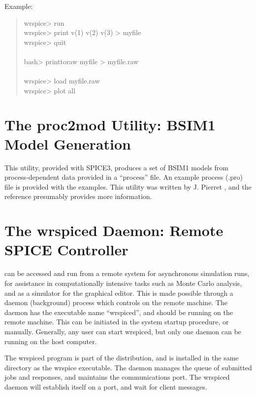 {Example:
\begin{quote}
{\vt wrspice> run}\\
{\vt wrspice> print v(1) v(2) v(3) > myfile}\\
{\vt wrspice> quit}\\
\\
{\vt bash> printtoraw myfile > myfile.raw}\\
\\
{\vt wrspice> load myfile.raw}\\
{\vt wrspice> plot all}
\end{quote}


\section{The {\vt proc2mod} Utility: BSIM1 Model Generation}


This utility, provided with SPICE3, produces a set of BSIM1 models
from process-dependent data provided in a ``process'' file.  An
example process ({\vt .pro}) file is provided with the {\WRspice}
examples.  This utility was written by J.  Pierret \cite{pierret},
and the reference presumably provides more information.


\section{The {\vt wrspiced} Daemon: Remote SPICE Controller}
\label{wrspiced}


{\WRspice} can be accessed and run from a remote system for
asynchronous simulation runs, for assistance in computationally
intensive tasks such as Monte Carlo analysis, and as a simulator for
the {\Xic} graphical editor.  This is made possible through a daemon
(background) process which controls {\WRspice} on the remote machine. 
The daemon has the executable name ``{\vt wrspiced}'', and should be
running on the remote machine.  This can be initiated in the system
startup procedure, or manually.  Generally, any user can start {\vt
wrspiced}, but only one daemon can be running on the host computer.

The {\vt wrspiced} program is part of the {\WRspice} distribution, and
is installed in the same directory as the {\vt wrspice} executable. 
The daemon manages the queue of submitted jobs and responses, and
maintains the communications port.  The {\vt wrspiced} daemon will
establish itself on a port, and wait for client messages.

}
